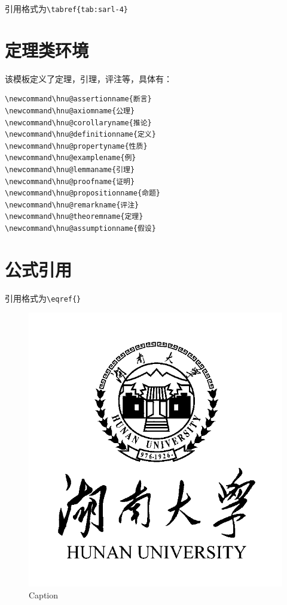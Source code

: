 引用格式为\lstinline!\tabref{tab:sarl-4}!

\section{定理类环境}
该模板定义了定理，引理，评注等，具体有：
\begin{lstlisting}
\newcommand\hnu@assertionname{断言}
\newcommand\hnu@axiomname{公理}
\newcommand\hnu@corollaryname{推论}
\newcommand\hnu@definitionname{定义}
\newcommand\hnu@propertyname{性质}
\newcommand\hnu@examplename{例}
\newcommand\hnu@lemmaname{引理}
\newcommand\hnu@proofname{证明}
\newcommand\hnu@propositionname{命题}
\newcommand\hnu@remarkname{评注}
\newcommand\hnu@theoremname{定理}
\newcommand\hnu@assumptionname{假设}
\end{lstlisting}

\section{公式引用}
引用格式为\lstinline!\eqref{}!

\begin{figure}
    \centering
    \includegraphics{HNU_DoctoralThesis_Latex/figures/hnu-logo.png}
    \caption{Caption}
    \label{fig:1}
\end{figure}

